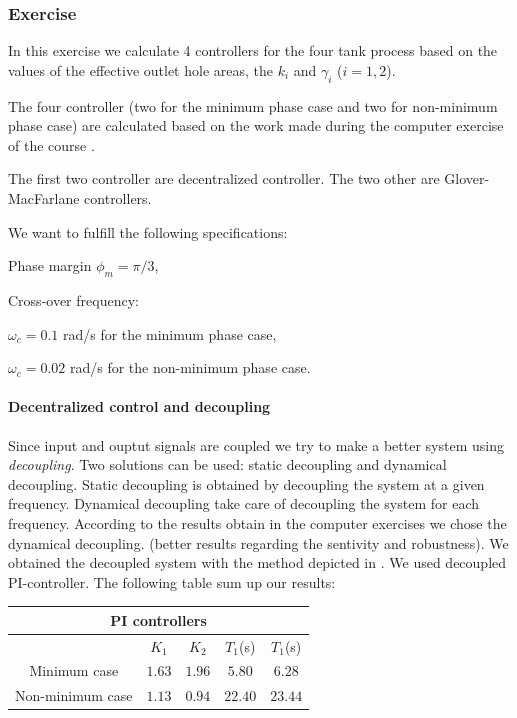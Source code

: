 \subsubsection{Exercise}

In this exercise we calculate 4 controllers for the four tank process based on the values of the effective outlet hole areas, the $k_i$ and $\gamma_i$ ($i=1,2$). 

The four controller (two for the minimum phase case and two for non-minimum phase case) are calculated based on the work made during the computer exercise of the course \cite{exo4}. 

The first two controller are decentralized controller. The two other are Glover-MacFarlane controllers.

We want to fulfill the following specifications:
\begin{shortitemize}
    \item Phase margin $\phi_m = \pi/3$,
    \item Cross-over frequency:
        \begin{shortitemize}
            \item $\omega_c = 0.1$ rad/s for the minimum phase case,
            \item $\omega_c = 0.02$ rad/s for the non-minimum phase case.
        \end{shortitemize}
\end{shortitemize}

\paragraph{Decentralized control and decoupling}

Since input and ouptut signals are coupled we try to make a better system using \emph{decoupling}. 
Two solutions can be used: static decoupling and dynamical decoupling. 
Static decoupling is obtained by decoupling the system at a given frequency.
Dynamical decoupling take care of decoupling the system for each frequency.
According to the results obtain in the computer exercises we chose the dynamical decoupling. (better results regarding the sentivity and robustness). 
We obtained the decoupled system with the method depicted in \cite{exo4}.
We used decoupled PI-controller. The following table sum up our results:

\begin{center}
\begin{tabular}{|c|cccc|}
    \hline
    \multicolumn{5}{|c|}{PI controllers} \\
    \hline
    & $K_1$ & $K_2$ & $T_1$(s) & $T_1$(s) \\ 
    Minimum case & $1.63$ & $1.96$ & $5.80$ & $6.28$\\
    Non-minimum case &  $1.13$ & $0.94$ & $22.40$ & $23.44$ \\
    \hline
\end{tabular}
\end{center}

